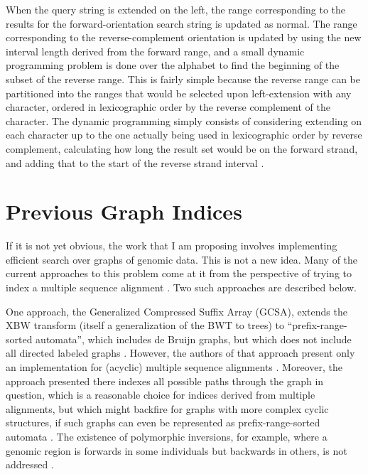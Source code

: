 \documentclass[11pt,proposal]{ucthesis}
\begin{document}
When the query string is extended on the left, the range corresponding to the results for the forward-orientation search string is updated as normal. The range corresponding to the reverse-complement orientation is updated by using the new interval length derived from the forward range, and a small dynamic programming problem is done over the alphabet to find the beginning of the subset of the reverse range. This is fairly simple because the reverse range can be partitioned into the ranges that would be selected upon left-extension with any character, ordered in lexicographic order by the reverse complement of the character. The dynamic programming simply consists of considering extending on each character up to the one actually being used in lexicographic order by reverse complement, calculating how long the result set would be on the forward strand, and adding that to the start of the reverse strand interval \cite{li2012exploring}.






\section{Previous Graph Indices}

If it is not yet obvious, the work that I am proposing involves implementing efficient search over graphs of genomic data. This is not a new idea. Many of the current approaches to this problem come at it from the perspective of trying to index a multiple sequence alignment \cite{siren2014indexing}. Two such approaches are described below.

One approach, the Generalized Compressed Suffix Array (GCSA), extends the XBW transform (itself a generalization of the BWT to trees) to ``prefix-range-sorted automata'', which includes de Bruijn graphs, but which does not include all directed labeled graphs \cite{siren2014indexing}. However, the authors of that approach present only an implementation for (acyclic) multiple sequence alignments \cite{siren2014indexing}. Moreover, the approach presented there indexes all possible paths through the graph in question, which is a reasonable choice for indices derived from multiple alignments, but which might backfire for graphs with more complex cyclic structures, if such graphs can even be represented as prefix-range-sorted automata \cite{siren2014indexing}. The existence of polymorphic inversions, for example, where a genomic region is forwards in some individuals but backwards in others, is not addressed \cite{siren2014indexing}.
\end{document}
